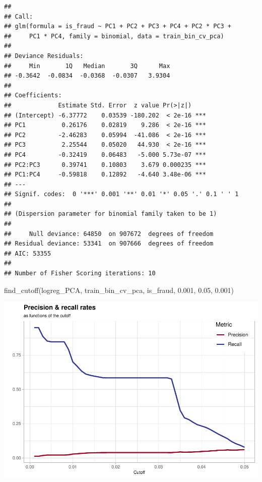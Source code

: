 \documentclass[
]{report}
\newenvironment{Shaded}{\begin{snugshade}}{\end{snugshade}}
\newcommand{\FloatTok}[1]{\textcolor[rgb]{0.00,0.00,0.81}{#1}}
\newcommand{\FunctionTok}[1]{\textcolor[rgb]{0.00,0.00,0.00}{#1}}
\newcommand{\NormalTok}[1]{#1}
\newcommand{\StringTok}[1]{\textcolor[rgb]{0.31,0.60,0.02}{#1}}
\begin{document}
\begin{verbatim}
## 
## Call:
## glm(formula = is_fraud ~ PC1 + PC2 + PC3 + PC4 + PC2 * PC3 + 
##     PC1 * PC4, family = binomial, data = train_bin_cv_pca)
## 
## Deviance Residuals: 
##     Min       1Q   Median       3Q      Max  
## -0.3642  -0.0834  -0.0368  -0.0307   3.9304  
## 
## Coefficients:
##             Estimate Std. Error  z value Pr(>|z|)    
## (Intercept) -6.37772    0.03539 -180.202  < 2e-16 ***
## PC1          0.26176    0.02819    9.286  < 2e-16 ***
## PC2         -2.46283    0.05994  -41.086  < 2e-16 ***
## PC3          2.25544    0.05020   44.930  < 2e-16 ***
## PC4         -0.32419    0.06483   -5.000 5.73e-07 ***
## PC2:PC3      0.39741    0.10803    3.679 0.000235 ***
## PC1:PC4     -0.59818    0.12892   -4.640 3.48e-06 ***
## ---
## Signif. codes:  0 '***' 0.001 '**' 0.01 '*' 0.05 '.' 0.1 ' ' 1
## 
## (Dispersion parameter for binomial family taken to be 1)
## 
##     Null deviance: 64850  on 907672  degrees of freedom
## Residual deviance: 53341  on 907666  degrees of freedom
## AIC: 53355
## 
## Number of Fisher Scoring iterations: 10
\end{verbatim}

\begin{Shaded}
\begin{Highlighting}[]
\FunctionTok{find\_cutoff}\NormalTok{(logreg\_PCA, train\_bin\_cv\_pca, }\StringTok{\textquotesingle{}is\_fraud\textquotesingle{}}\NormalTok{, }\FloatTok{0.001}\NormalTok{, }\FloatTok{0.05}\NormalTok{, }\FloatTok{0.001}\NormalTok{)}
\end{Highlighting}
\end{Shaded}

\includegraphics{credit_card_fraud_detection_files/figure-latex/logreg_PCA-1.pdf}
\end{document}
